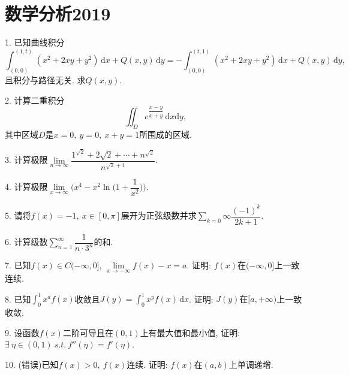 \documentclass[12pt, a4paper, twoside]{ctexart}%
\newcommand{\rmd}{\mathrm{d}} %
\begin{document}
	\section{数学分析2019}
	1. 已知曲线积分\[\int_{(0,0)}^{(1,t)}(x^2+2xy+y^2)\,\rmd x+Q(x,y)\,\rmd y=-\int_{(0,0)}^{(t,1)}(x^2+2xy+y^2)\,\rmd x+Q(x,y)\,\rmd y,\]
	且积分与路径无关. 求$Q(x,y)$.\par 
	2. 计算二重积分\[\iint_D e^\dfrac{x-y}{x+y}\,\rmd x\rmd y,\]其中区域$D$是$x=0,\ y=0,\ x+y=1$所围成的区域. \par
	3. 计算极限$\lim\limits_{n\rightarrow\infty}\dfrac{1^{\sqrt{2}}+2{\sqrt{2}}+\cdots+n^{\sqrt{2}}}{n^{\sqrt{2}+1}}$.\par
	4. 计算极限$\lim\limits_{x\rightarrow\infty}\Big(x^4-x^2\ln\Big(1+\dfrac{1}{x^2}\Big)\Big)$.\par 
	5. 请将$f(x)=-1,\ x\in[0,\pi]$展开为正弦级数并求$\sum\limits_{k=0}\infty\dfrac{(-1)^k}{2k+1}$.\par 
	6. 计算级数$\sum\limits_{n=1}^\infty\dfrac{1}{n\cdot3^n}$的和.\par
	7. 已知$f(x)\in C(-\infty,0],\ \lim\limits_{x\rightarrow-\infty}f(x)-x=a$. 证明: $f(x)\mbox{在}(-\infty,0]$上一致连续.\par
	8. 已知$\int_0^1x^af(x)$收敛且$J(y)=\int_0^1x^yf(x)\,\rmd x$. 证明: $J(y)\mbox{在}[a,+\infty)$上一致收敛.\par
	9. 设函数$f(x)$二阶可导且在$(0,1)$上有最大值和最小值, 证明: $\exists\ \eta\in(0,1)\ s.t.\ f''(\eta)=f'(\eta)$.\par 
	10. (错误)已知$f(x)>0,\ f(x)$连续. 证明: $f(x)\mbox{在}(a,b)$上单调递增.
	\clearpage
\end{document}
